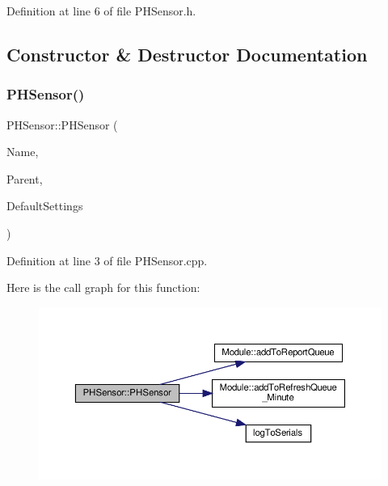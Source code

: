 Definition at line 6 of file P\+H\+Sensor.\+h.



\subsection{Constructor \& Destructor Documentation}
\mbox{\label{class_p_h_sensor_afe168dbbb29e3ecda521de4ef47ad6ee}} 
\subsubsection{\texorpdfstring{P\+H\+Sensor()}{PHSensor()}\hspace{0.1cm}{\footnotesize\ttfamily [1/2]}}
{\footnotesize\ttfamily P\+H\+Sensor\+::\+P\+H\+Sensor (\begin{DoxyParamCaption}\item[{const \+\_\+\+\_\+\+Flash\+String\+Helper $\ast$}]{Name,  }\item[{\hyperlink{class_module}{Module} $\ast$}]{Parent,  }\item[{\hyperlink{struct_settings_1_1_p_h_sensor_settings}{Settings\+::\+P\+H\+Sensor\+Settings} $\ast$}]{Default\+Settings }\end{DoxyParamCaption})}



Definition at line 3 of file P\+H\+Sensor.\+cpp.

Here is the call graph for this function\+:
\nopagebreak
\begin{figure}[H]
\begin{center}
\leavevmode
\includegraphics[width=350pt]{class_p_h_sensor_afe168dbbb29e3ecda521de4ef47ad6ee_cgraph}
\end{center}
\end{figure}
\mbox{\label{class_p_h_sensor_afe168dbbb29e3ecda521de4ef47ad6ee}} 
